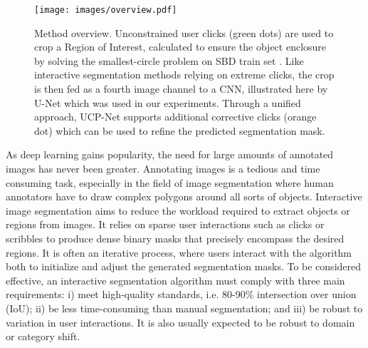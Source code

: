 \documentclass[letterpaper, 10 pt, conference]{ieeeconf}
\begin{document}
\begin{figure*}[!t]
    \centering
    \texttt{[image: images/overview.pdf]}
    \caption{Method overview. Unconstrained user clicks (green dots) are used to crop a Region of Interest, calculated to ensure the object enclosure by solving the smallest-circle problem on SBD train set \cite{bharath11}. Like interactive segmentation methods relying on extreme clicks, the crop is then fed as a fourth image channel to a CNN, illustrated here by U-Net which was used in our experiments. Through a unified approach, UCP-Net supports additional corrective clicks (orange dot) which can be used to refine the predicted segmentation mask.}
    \label{fig:overview}
\end{figure*}
\label{sec:intro}
As deep learning gains popularity, the need for large amounts of annotated images has never been greater.  Annotating images is a tedious and time consuming task, especially in the field of image segmentation where human annotators have to draw complex polygons around all sorts of objects. Interactive image segmentation aims to reduce the workload required to extract objects or regions from images. It relies on sparse user interactions such as clicks or scribbles to produce dense binary masks that precisely encompass the desired regions. It is often an iterative process, where users interact with the algorithm both to initialize and adjust the generated segmentation masks. To be considered effective, an interactive segmentation algorithm must comply with three main requirements: i) meet high-quality standards, i.e. 80-90\% intersection over union (IoU); ii) be less time-consuming than manual segmentation; and iii) be robust to variation in user interactions. It is also usually expected to be robust to domain or category shift.
\bigbreak
\end{document}
